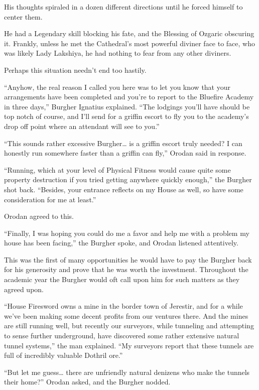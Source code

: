 \documentclass[a4paper,10pt]{book}
\begin{document}
His thoughts spiraled in a dozen different directions until he forced himself to center them.\par
He had a Legendary skill blocking his fate, and the Blessing of Ozgaric obscuring it. Frankly, unless he met the Cathedral’s most powerful diviner face to face, who was likely Lady Lakshiya, he had nothing to fear from any other diviners.\par
Perhaps this situation needn’t end too hastily.\par
“Anyhow, the real reason I called you here was to let you know that your arrangements have been completed and you’re to report to the Bluefire Academy in three days,” Burgher Ignatius explained. “The lodgings you’ll have should be top notch of course, and I’ll send for a griffin escort to fly you to the academy’s drop off point where an attendant will see to you.”\par
“This sounds rather excessive Burgher… is a griffin escort truly needed? I can honestly run somewhere faster than a griffin can fly,” Orodan said in response.\par
“Running, which at your level of Physical Fitness would cause quite some property destruction if you tried getting anywhere quickly enough,” the Burgher shot back. “Besides, your entrance reflects on my House as well, so have some consideration for me at least.”\par
Orodan agreed to this.\par
“Finally, I was hoping you could do me a favor and help me with a problem my house has been facing,” the Burgher spoke, and Orodan listened attentively.\par
This was the first of many opportunities he would have to pay the Burgher back for his generosity and prove that he was worth the investment. Throughout the academic year the Burgher would oft call upon him for such matters as they agreed upon.\par
“House Firesword owns a mine in the border town of Jerestir, and for a while we’ve been making some decent profits from our ventures there. And the mines are still running well, but recently our surveyors, while tunneling and attempting to sense further underground, have discovered some rather extensive natural tunnel systems,” the man explained. “My surveyors report that these tunnels are full of incredibly valuable Dothril ore.”\par
“But let me guess… there are unfriendly natural denizens who make the tunnels their home?” Orodan asked, and the Burgher nodded.\par
\end{document}
